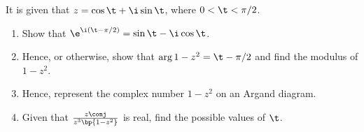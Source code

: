 \begin{problem}[\chili]
    It is given that $z = \cos \t + \i \sin \t$, where $0 < \t < \pi/2$.

    \begin{enumerate}
        \item Show that $\e^{\i (\t - \pi/2)} = \sin\t - \i \cos \t$.
        \item Hence, or otherwise, show that $\arg{1 - z^2} = \t - \pi/2$ and find the modulus of $1 - z^2$.
        \item Hence, represent the complex number $1 - z^2$ on an Argand diagram.
        \item Given that $\frac{z\conj}{z^3 \bp{1 - z^2}}$ is real, find the possible values of $\t$.
    \end{enumerate}
\end{problem}
